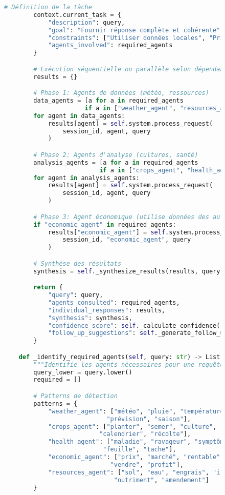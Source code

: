 \begin{figure}[h]
\begin{lstlisting}[language=Python, caption=Système de gestion du contexte inter-agents]
        # Définition de la tâche
        context.current_task = {
            "description": query,
            "goal": "Fournir réponse complète et cohérente",
            "constraints": ["Utiliser données locales", "Prioriser durabilité"],
            "agents_involved": required_agents
        }

        # Exécution séquentielle ou parallèle selon dépendances
        results = {}

        # Phase 1: Agents de données (météo, ressources)
        data_agents = [a for a in required_agents
                      if a in ["weather_agent", "resources_agent"]]
        for agent in data_agents:
            results[agent] = self.system.process_request(
                session_id, agent, query
            )

        # Phase 2: Agents d'analyse (cultures, santé)
        analysis_agents = [a for a in required_agents
                          if a in ["crops_agent", "health_agent"]]
        for agent in analysis_agents:
            results[agent] = self.system.process_request(
                session_id, agent, query
            )

        # Phase 3: Agent économique (utilise données des autres)
        if "economic_agent" in required_agents:
            results["economic_agent"] = self.system.process_request(
                session_id, "economic_agent", query
            )

        # Synthèse des résultats
        synthesis = self._synthesize_results(results, query, context)

        return {
            "query": query,
            "agents_consulted": required_agents,
            "individual_responses": results,
            "synthesis": synthesis,
            "confidence_score": self._calculate_confidence(results),
            "follow_up_suggestions": self._generate_follow_ups(results, context)
        }

    def _identify_required_agents(self, query: str) -> List[str]:
        """Identifie les agents nécessaires pour une requête."""
        query_lower = query.lower()
        required = []

        # Patterns de détection
        patterns = {
            "weather_agent": ["météo", "pluie", "température", "climat",
                            "prévision", "saison"],
            "crops_agent": ["planter", "semer", "culture", "variété",
                          "calendrier", "récolte"],
            "health_agent": ["maladie", "ravageur", "symptôme", "traitement",
                           "feuille", "tache"],
            "economic_agent": ["prix", "marché", "rentable", "coût",
                             "vendre", "profit"],
            "resources_agent": ["sol", "eau", "engrais", "irrigation",
                              "nutriment", "amendement"]
        }


\end{lstlisting}
\end{figure}
